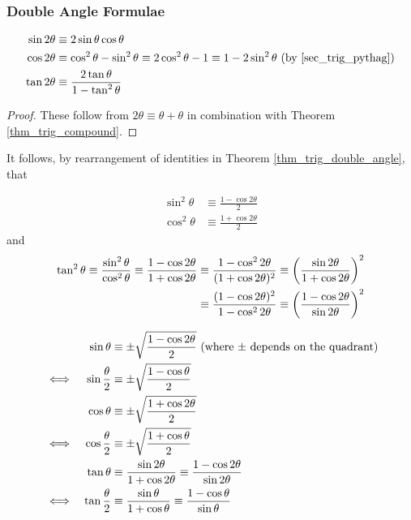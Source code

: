\subsubsection{Double Angle Formulae} \label{sec_trig_double_angle}
\begin{theorem} \label{thm_trig_double_angle}
\begin{align*}
\sin 2\theta &\equiv
   2\sin \theta \cos \theta \\
\cos 2\theta &\equiv
   \cos^2 \theta - \sin^2 \theta \equiv
   2\cos^2 \theta - 1 \equiv 1 - 2\sin^2 \theta
   \ \text{(by \ref{sec_trig_pythag})} \\
\tan 2\theta &\equiv
    \frac{2\tan \theta}{1 - \tan^2 \theta}
\end{align*}
\end{theorem}
\begin{proof}
These follow from \(2\theta \equiv \theta + \theta\) in combination with
Theorem \ref{thm_trig_compound}.
\end{proof}
It follows, by rearrangement of identities in Theorem
\ref{thm_trig_double_angle}, that
\begin{theorem}
\begin{align*}
\sin^2 \theta &\equiv
    \frac{1 - \cos 2 \theta} 2 \\
\cos^2 \theta &\equiv
    \frac{1 + \cos 2 \theta} 2
\end{align*}
and
\begin{align*}
\tan^2 \theta \equiv \frac{\sin^2 \theta}{\cos^2 \theta}
    \equiv \frac{1 - \cos 2 \theta}{1 + \cos 2 \theta}
    &\equiv \frac{1 - \cos^2 2 \theta}{(1 + \cos 2 \theta)^2}
    \equiv \pqty{\frac{\sin 2 \theta}{1 + \cos 2 \theta}}^2 \\
    &\equiv \frac{(1 - \cos 2 \theta)^2}{1 - \cos^2 2 \theta}
    \equiv \pqty{\frac{1 - \cos 2 \theta}{\sin 2 \theta}}^2
\end{align*}
\end{theorem}
\begin{theorem} \label{thm_trig_half_angle}
\begin{alignat*}{2}
&&\sin \theta &\equiv
    \pm\sqrt{\frac{1 - \cos 2 \theta} 2}
 \ \pqty{\text{where \(\pm\) depends on the quadrant}} \\
&\iff& \sin \frac \theta 2 &\equiv
    \pm\sqrt{\frac{1 - \cos \theta} 2} \\
&&\cos \theta &\equiv
    \pm\sqrt{\frac{1 + \cos 2 \theta} 2} \\
&\iff& \cos \frac \theta 2 &\equiv
    \pm\sqrt{\frac{1 + \cos \theta} 2} \\
&&\tan \theta &\equiv
    \frac{\sin 2 \theta}{1 + \cos 2 \theta}
    \equiv \frac{1 - \cos 2 \theta}{\sin 2 \theta} \\
&\iff& \tan \frac \theta 2 &\equiv
    \frac{\sin \theta}{1 + \cos \theta}
    \equiv \frac{1 - \cos \theta}{\sin \theta}
\end{alignat*}
\end{theorem}


